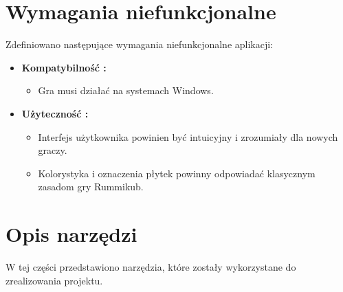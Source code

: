\documentclass[a4paper,twoside,12pt]{book}
\begin{document}
	\section{Wymagania niefunkcjonalne}
	Zdefiniowano następujące wymagania niefunkcjonalne aplikacji:
	\begin{itemize}
		\item \textbf{Kompatybilność :}
		\begin{itemize}
			\item Gra musi działać na systemach Windows.
		\end{itemize}
		
		\item \textbf{Użyteczność :}
		\begin{itemize}
			\item Interfejs użytkownika powinien być intuicyjny i zrozumiały dla nowych graczy.
			\item Kolorystyka i oznaczenia płytek powinny odpowiadać klasycznym zasadom gry Rummikub.
		\end{itemize}
	\end{itemize}
	
	\section{Opis narzędzi}
	W tej części przedstawiono narzędzia, które zostały wykorzystane do zrealizowania projektu.
\end{document}

